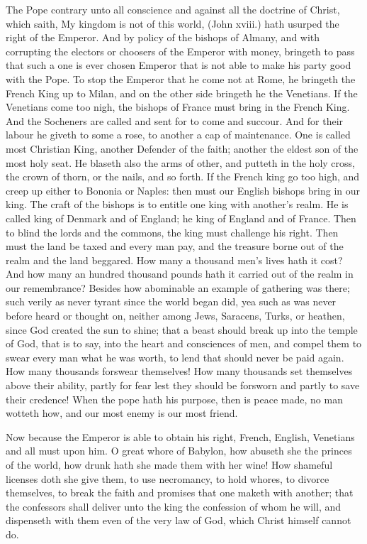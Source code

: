 The Pope contrary unto all conscience and against all 
the doctrine of Christ, which saith, My kingdom is not of 
this world, (John xviii.) hath usurped the right of the Emperor.
And by policy of the bishops of Almany, and 
with corrupting the electors or choosers of the Emperor 
with money, bringeth to pass that such a one is ever chosen 
Emperor that is not able to make his party good with the 
Pope. To stop the Emperor that he come not at Rome,
he bringeth the French King up to Milan, and on the 
other side bringeth he the Venetians. If the Venetians 
come too nigh, the bishops of France must bring in the 
French King. And the Socheners are called and sent for 
to come and succour. And for their labour he giveth to 
some a rose, to another a cap of maintenance. One is 
called most Christian King, another Defender of the faith;
another the eldest son of the most holy seat. He blaseth 
also the arms of other, and putteth in the holy cross, the 
crown of thorn, or the nails, and so forth. If the French 
king go too high, and creep up either to Bononia or 
Naples: then must our English bishops bring in our king. 
The craft of the bishops is to entitle one king with another's 
realm. He is called king of Denmark and of England;
he king of England and of France. Then to blind the lords 
and the commons, the king must challenge his right. Then 
must the land be taxed and every man pay, and the treasure 
borne out of the realm and the land beggared. How many a 
thousand men's lives hath it cost? And how many an hundred
thousand pounds hath it carried out of the realm in our 
remembrance? Besides how abominable an example of 
gathering was there; such verily as never tyrant since the 
world began did, yea such as was never before heard or 
thought on, neither among Jews, Saracens, Turks, or 
heathen, since God created the sun to shine; that a beast 
should break up into the temple of God, that is to say, 
into the heart and consciences of men, and compel them 
to swear every man what he was worth, to lend that should 
never be paid again. How many thousands forswear 
themselves! How many thousands set themselves above 
their ability, partly for fear lest they should be forsworn 
and partly to save their credence! When the pope hath 
his purpose, then is peace made, no man wotteth how, 
and our most enemy is our most friend.

Now because the Emperor is able to obtain his right, 
French, English, Venetians and all must upon him. O 
great whore of Babylon, how abuseth she the princes of 
the world, how drunk hath she made them with her wine!
How shameful licenses doth she give them, to use necromancy,
to hold whores, to divorce themselves, to break the 
faith and promises that one maketh with another; that the 
confessors shall deliver unto the king the confession of 
whom he will, and dispenseth with them even of the very 
law of God, which Christ himself cannot do. 


